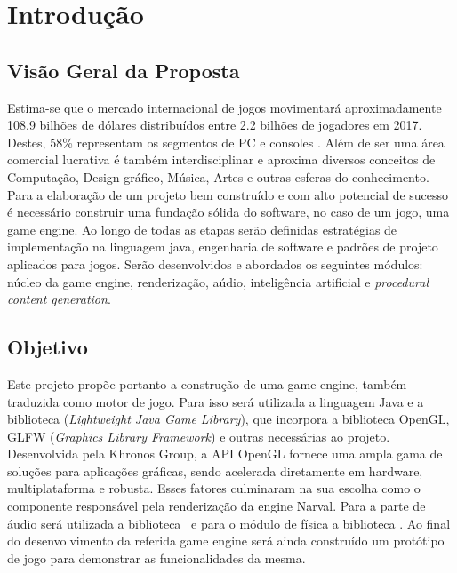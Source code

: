 \documentclass[12pt, 
openright, 
oneside, 
a4paper,    
brazil]{facom-ufu-abntex2}
\begin{document}

\chapter{Introdução}

\section{Visão Geral da Proposta}
Estima-se que o mercado internacional de jogos movimentará aproximadamente 108.9
bilhões de dólares distribuídos entre 2.2 bilhões de jogadores em 2017. Destes, 58\%
representam os segmentos de PC e consoles \cite{GameMarketArticle}. Além de ser uma área
comercial lucrativa é também interdisciplinar e aproxima
diversos conceitos de Computação, Design gráfico, Música, Artes e outras esferas do
conhecimento.
Para a elaboração de um projeto bem construído e com alto potencial de
sucesso é necessário construir uma fundação sólida do software, no caso de um jogo, uma game engine. Ao longo de todas as etapas serão definidas estratégias de
implementação na linguagem java, engenharia de software e padrões de projeto
aplicados para jogos. Serão desenvolvidos e abordados os seguintes módulos: núcleo da game engine, renderização, aúdio, inteligência artificial e \textit{procedural content generation}.

\section{Objetivo}
Este projeto propõe portanto a construção de uma game engine, também traduzida como motor de jogo. Para isso será utilizada a linguagem Java e a biblioteca  (\textit{Lightweight Java Game Library}), que incorpora a biblioteca OpenGL, GLFW (\textit{Graphics Library Framework}) e outras necessárias ao projeto.
Desenvolvida pela Khronos Group, a API OpenGL fornece uma ampla gama de soluções para aplicações gráficas, sendo acelerada diretamente em
hardware, multiplataforma e robusta. Esses fatores culminaram na sua escolha como o componente responsável pela renderização da engine Narval. Para a parte de áudio será utilizada a biblioteca~ e para o módulo de física a biblioteca . 
Ao final do desenvolvimento da referida game engine será ainda construído um protótipo de jogo para demonstrar as funcionalidades da mesma. 
\end{document}
